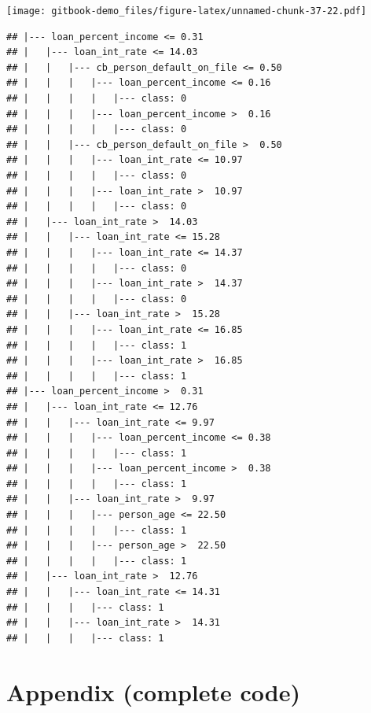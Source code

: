 \documentclass[
]{book}
\begin{document}
\texttt{[image: gitbook-demo\_files/figure-latex/unnamed-chunk-37-22.pdf]}

\begin{verbatim}
## |--- loan_percent_income <= 0.31
## |   |--- loan_int_rate <= 14.03
## |   |   |--- cb_person_default_on_file <= 0.50
## |   |   |   |--- loan_percent_income <= 0.16
## |   |   |   |   |--- class: 0
## |   |   |   |--- loan_percent_income >  0.16
## |   |   |   |   |--- class: 0
## |   |   |--- cb_person_default_on_file >  0.50
## |   |   |   |--- loan_int_rate <= 10.97
## |   |   |   |   |--- class: 0
## |   |   |   |--- loan_int_rate >  10.97
## |   |   |   |   |--- class: 0
## |   |--- loan_int_rate >  14.03
## |   |   |--- loan_int_rate <= 15.28
## |   |   |   |--- loan_int_rate <= 14.37
## |   |   |   |   |--- class: 0
## |   |   |   |--- loan_int_rate >  14.37
## |   |   |   |   |--- class: 0
## |   |   |--- loan_int_rate >  15.28
## |   |   |   |--- loan_int_rate <= 16.85
## |   |   |   |   |--- class: 1
## |   |   |   |--- loan_int_rate >  16.85
## |   |   |   |   |--- class: 1
## |--- loan_percent_income >  0.31
## |   |--- loan_int_rate <= 12.76
## |   |   |--- loan_int_rate <= 9.97
## |   |   |   |--- loan_percent_income <= 0.38
## |   |   |   |   |--- class: 1
## |   |   |   |--- loan_percent_income >  0.38
## |   |   |   |   |--- class: 1
## |   |   |--- loan_int_rate >  9.97
## |   |   |   |--- person_age <= 22.50
## |   |   |   |   |--- class: 1
## |   |   |   |--- person_age >  22.50
## |   |   |   |   |--- class: 1
## |   |--- loan_int_rate >  12.76
## |   |   |--- loan_int_rate <= 14.31
## |   |   |   |--- class: 1
## |   |   |--- loan_int_rate >  14.31
## |   |   |   |--- class: 1
\end{verbatim}

\hypertarget{appendix-complete-code-5}{%
\section{Appendix (complete code)}\label{appendix-complete-code-5}}
\end{document}
